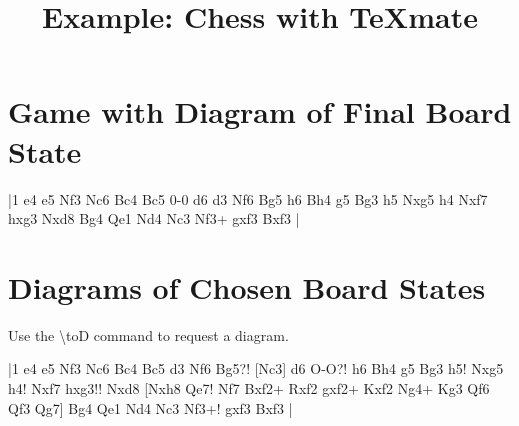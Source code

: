 \documentclass[a4paper]{article}
\title{Example: Chess with TeXmate}
\date{}
\begin{document}
\maketitle

\section{Game with Diagram of Final Board State}

\makegametitle
|1 e4 e5 Nf3 Nc6 Bc4 Bc5 0-0 d6 d3 Nf6 Bg5
h6 Bh4 g5 Bg3 h5 Nxg5 h4 Nxf7 hxg3
Nxd8 Bg4 Qe1 Nd4 Nc3 Nf3+ gxf3 Bxf3 \resigns|
\begin{figure}[h]
\centering
\showboard
\end{figure}

\newpage
\section{Diagrams of Chosen Board States}

Use the \textbackslash toD command to request a diagram.

\makegametitle
  |1 e4 e5 Nf3 Nc6 Bc4 Bc5 d3 Nf6 Bg5?! [Nc3]
  d6 O-O?! h6 Bh4 g5 Bg3 h5! Nxg5 h4! Nxf7 hxg3!!
   Nxd8 [Nxh8 Qe7!  Nf7 Bxf2+
  Rxf2 gxf2+ Kxf2 Ng4+ Kg3 Qf6 Qf3 Qg7\BBetter] Bg4
  Qe1 Nd4 Nc3
  Nf3+! gxf3 Bxf3  \resigns|
\begin{figure}[h]
\makediagrams
\end{figure}
\end{document}
